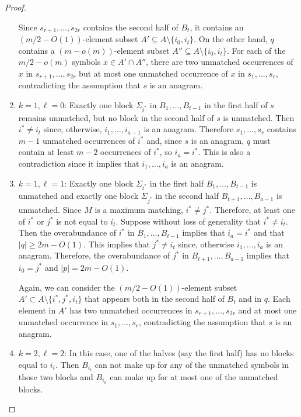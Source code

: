\documentclass[kpfonts]{patmorin}
\begin{document}
\begin{proof}
\begin{enumerate}
        Since $s_{r+1},\ldots,s_{2r}$ contains the second half of $B_t$, it contains an $(m/2-O(1))$-element subset $A'\subseteq A\setminus\{i_0,i_t\}$. On the other hand, $q$ contains a $(m-o(m))$-element subset $A''\subseteq A\setminus\{i_0,i_t\}$.  For each of the $m/2-o(m)$ symbols $x\in A'\cap A''$, there are two unmatched occurrences of $x$ in $s_{r+1},\ldots,s_{2r}$ but at most one unmatched occurrence of $x$ in $s_1,\ldots,s_r$, contradicting the assumption that $s$ is an anagram.

        \item $k=1,\ell=0$: Exactly one block $\Sigma_{i^*}$ in $B_1,\ldots,B_{t-1}$ in the first half of $s$ remains unmatched, but no block in the second half of $s$ is unmatched.  Then $i^*\neq i_t$ since, otherwise, $i_1,\ldots,i_{a-1}$ is an anagram. Therefore $s_1,\ldots,s_r$ contains $m-1$ unmatched occurrences of $i^*$ and, since $s$ is an anagram, $q$ must contain at least $m-2$ occurrences of $i^*$, so $i_a=i^*$.  This is also a contradiction since it implies that $i_1,\ldots,i_a$ is an anagram.

        \item $k=1,\ell=1$: Exactly one block $\Sigma_{i^*}$ in the first half $B_1,\ldots,B_{t-1}$ is unmatched and exactly one block $\Sigma_{j^*}$ in the second half $B_{t+1},\ldots,B_{a-1}$ is unmatched. Since $M$ is a maximum matching, $i^*\neq j^*$.  Therefore, at least one of $i^*$ or $j^*$ is not equal to $i_t$.  Suppose without loss of generality that $i^*\neq i_t$. Then the overabundance of $i^*$ in $B_{1},\ldots,B_{t-1}$ implies that $i_a=i^*$ and that $|q|\ge 2m-O(1)$.  This implies that $j^*\neq i_t$ since, otherwise $i_1,\ldots,i_a$ is an anagram.  Therefore, the overabundance of $j^*$ in $B_{t+1},\ldots,B_{a-1}$ implies that  $i_0=j^*$ and $|p|= 2m-O(1)$.

        Again, we can consider the $(m/2-O(1))$-element subset $A'\subset A\setminus\{i^*,j^*,i_t\}$ that appears both in the second half of $B_t$ and in $q$.  Each element in $A'$ has two unmatched occurrences in $s_{r+1},\ldots,s_{2r}$ and at most one unmatched occurrence in $s_1,\ldots,s_r$, contradicting the assumption that $s$ is an anagram.

        \item $k=2,\ell=2$: In this case, one of the halves (say the first half) has no blocks equal to $i_t$.  Then $B_{i_t}$ can not make up for any of the unmatched symbols in those two blocks and $B_{i_a}$ can make up for at most one of the unmatched blocks.


\end{enumerate}
\end{proof}
\end{document}
